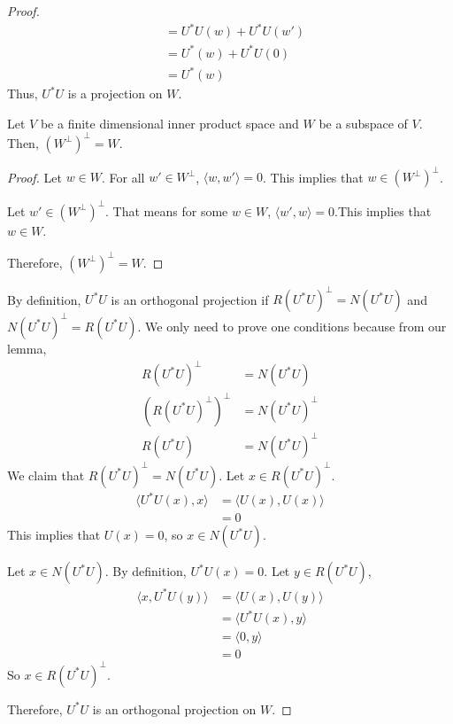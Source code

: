 \documentclass[11pt]{scrartcl}
\begin{document}
\begin{enumerate}[label=\alph*.]
{\begin{proof}
\begin{align*}
			                & = U^{*}U(w) + U^{*}U(w') \\
			                & = U^{*}(w) + U^{*}U(0)   \\
			                & = U^{*}(w)
		      \end{align*}
		      Thus, $U^{*}U$ is a projection on $W$.
		      \begin{lemma}
			      Let $V$ be a finite dimensional inner product space and $W$ be a subspace of $V$. Then, $(W^\perp)^\perp = W$.
			      \begin{proof}
					Let $w \in W$. For all $w' \in W^\perp$, $ \langle w, w' \rangle = 0$. This implies that $w \in (W^\perp)^\perp$.\par
					Let $w' \in (W^\perp)^\perp$. That means for some $w \in W$, $ \langle w', w \rangle = 0$.This implies that $w \in W$. \par
					Therefore, $(W^\perp)^\perp = W$.
			      \end{proof}
		      \end{lemma}
		      By definition, $U^{*}U$ is an orthogonal projection if $R(U^{*}U)^\perp = N(U^{*}U)$ and $N(U^{*}U)^\perp = R(U^{*}U)$.
		      We only need to prove one conditions because from our lemma,
		      \begin{align*}
			      R(U^{*}U)^\perp         & = N(U^{*}U)       \\
			      (R(U^{*}U)^\perp)^\perp & = N(U^{*}U)^\perp \\
			      R(U^{*}U)               & = N(U^{*}U)^\perp
		      \end{align*}
		      We claim that $R(U^{*}U)^\perp = N(U^{*}U)$. Let $x \in R(U^{*}U)^\perp$.
		      \begin{align*}
			      \langle U^{*}U(x), x \rangle & = \langle U(x), U(x) \rangle \\
			                                   & = 0
		      \end{align*}
		      This implies that $U(x) = 0$, so $x \in N(U^{*}U)$.\par
		      Let $x \in N(U^{*}U)$. By definition, $U^{*}U(x) = 0$. Let $y \in R(U^{*}U)$,
		      \begin{align*}
			      \langle x, U^{*}U(y) \rangle & = \langle U(x), U(y) \rangle   \\
			                                   & = \langle U^{*}U(x), y \rangle \\
			                                   & = \langle 0, y \rangle\\
			                                   & = 0
		      \end{align*}
			  So $x \in R(U^{*}U)^\perp$.\par
			  Therefore, $U^{*}U$ is an orthogonal projection on $W$.
	      \end{proof}
	      }
\end{enumerate}
\end{document}
